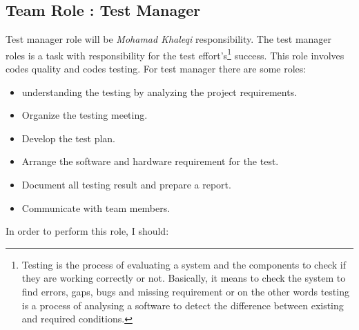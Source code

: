 \documentclass{article}
\begin{document}
\newpage
\subsection{Team Role : Test Manager}
Test manager role will be \textit{Mohamad Khaleqi} responsibility. The test manager roles is a task with responsibility for the test effort's\footnote{Testing is the process of evaluating a system and the components to check if they are working correctly or not. Basically, it means to check the system to find errors, gaps, bugs and missing requirement or on the other words testing is a process of analysing a software to detect the difference between existing and required conditions.
} success. This role involves codes quality and codes testing. For test manager there are some roles:
\begin{itemize}
 \item understanding the testing by analyzing the project requirements.
 \item Organize the testing meeting.
 \item Develop the test plan.
 \item Arrange the software and hardware requirement for the test.
 \item Document all testing result and prepare a report.
 \item Communicate with team members.
\end{itemize}
In order to perform this role, I should:
\end{document}
